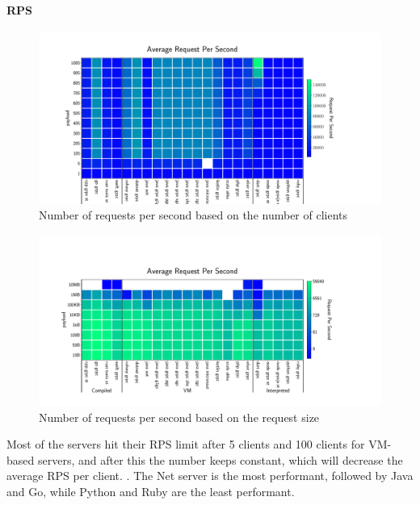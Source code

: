 \paragraph{RPS}
\begin{figure}[!hbt]
    \begin{center}
        \includegraphics[width=1.2\linewidth]{imgs/rps_clients}
    \end{center}
    \caption{Number of requests per second based on the number of clients}\label{fig:rps_clients}
\end{figure}

\begin{figure}[!hbt]
    \begin{center}
        \includegraphics[width=1.2\linewidth]{imgs/rps_payload}
    \end{center}
    \caption{Number of requests per second based on the request size}\label{fig:rps_payload}
\end{figure}
Most of the servers hit their RPS limit after 5 clients and 100 clients for VM-based servers, and after this the number keeps constant, which will decrease the average RPS per client.
. The Net server is the most performant, followed by Java and Go, while Python and Ruby are the least performant.

